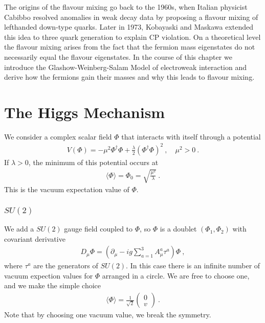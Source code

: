 \cite[Chapter 20]{Peskin}
\cite[Chapter 1.2.1]{Tevatron}
The origins of the flavour mixing go back to the 1960s, when Italian physicist Cabibbo resolved anomalies in weak decay data by proposing a flavour mixing of lefthanded down-type quarks. Later in 1973, Kobayaski and Maskawa extended this idea to three quark generation to explain CP violation. On a theoretical level the flavour mixing arises from the fact that the fermion mass eigenstates do not necessarily equal the flavour eigenstates. In the course of this chapter we introduce the Glashow-Weinberg-Salam Model of electroweak interaction and derive how the fermions gain their masses and why this leads to flavour mixing.

\section{The Higgs Mechanism}
We consider a complex scalar field $\Phi$ that interacts with itself through a potential
\begin{align}
	V(\Phi) = -\mu^2\Phi^\dagger\Phi + \frac{\lambda}{2}(\Phi^\dagger\Phi)^2 \ , \quad \mu^2 > 0 \ .
\end{align}
If $\lambda>0$, the minimum of this potential occurs at
\begin{align}
	\langle\Phi\rangle = \Phi_0 =  \sqrt{\frac{\mu^2}{\lambda}} \ .
\end{align}
This is the vacuum expectation value of $\Phi$.

\subsubsection{$SU(2)$}
We add a $SU(2)$ gauge field coupled to $\Phi$, so $\Phi$ is a doublet $(\Phi_1,\Phi_2)$ with covariant derivative
\begin{align}
	D_\mu\Phi = (\partial_\mu - ig\sum_{a=1}^3A_\mu^a\tau^a)\Phi \ ,
\end{align}
where $\tau^a$ are the generators of $SU(2)$. In this case there is an infinite number of vacuum expection values for $\Phi$ arranged in a circle. We are free to choose one, and we make the simple choice
\begin{align}
	\langle\Phi\rangle = \frac{1}{\sqrt{2}}\begin{pmatrix} 0 \\ v \end{pmatrix} \ .
\end{align}
Note that by choosing one vacuum value, we break the symmetry.


